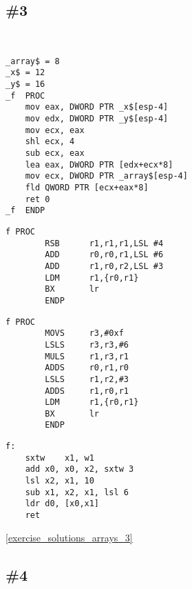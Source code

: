\subsection{\Exercise \#3}
\label{exercise_array_3}

\WhatThisCodeDoes\


\begin{lstlisting}[caption=\Optimizing MSVC 2010]
_array$ = 8
_x$ = 12
_y$ = 16
_f	PROC
	mov	eax, DWORD PTR _x$[esp-4]
	mov	edx, DWORD PTR _y$[esp-4]
	mov	ecx, eax
	shl	ecx, 4
	sub	ecx, eax
	lea	eax, DWORD PTR [edx+ecx*8]
	mov	ecx, DWORD PTR _array$[esp-4]
	fld	QWORD PTR [ecx+eax*8]
	ret	0
_f	ENDP
\end{lstlisting}

\begin{lstlisting}[caption=\NonOptimizingKeilVI (\ARMMode)]
f PROC
        RSB      r1,r1,r1,LSL #4
        ADD      r0,r0,r1,LSL #6
        ADD      r1,r0,r2,LSL #3
        LDM      r1,{r0,r1}
        BX       lr
        ENDP
\end{lstlisting}

\begin{lstlisting}[caption=\NonOptimizingKeilVI (\ThumbMode)]
f PROC
        MOVS     r3,#0xf
        LSLS     r3,r3,#6
        MULS     r1,r3,r1
        ADDS     r0,r1,r0
        LSLS     r1,r2,#3
        ADDS     r1,r0,r1
        LDM      r1,{r0,r1}
        BX       lr
        ENDP
\end{lstlisting}

\begin{lstlisting}[caption=\Optimizing GCC 4.9 (ARM64)]
f:
	sxtw	x1, w1
	add	x0, x0, x2, sxtw 3
	lsl	x2, x1, 10
	sub	x1, x2, x1, lsl 6
	ldr	d0, [x0,x1]
	ret
\end{lstlisting}



\Answer\: \ref{exercise_solutions_arrays_3}

\subsection{\Exercise \#4}
\label{exercise_array_4}

\WhatThisCodeDoes\


